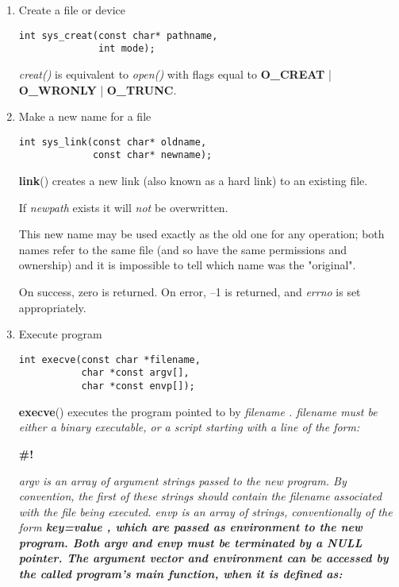 \documentclass[twoside]{article}
\begin{document}
\begin{multicols}{2}
\begin{enumerate}
{\bf close}{\rm ()}
returns zero on success.
On error, --1 is returned, and
{\it errno}
is set appropriately.



\item
Create a file or device
{\footnotesize
\begin{lstlisting}
int sys_creat(const char* pathname,
              int mode);
\end{lstlisting}
\par}

\emph{creat()} is equivalent to \emph{open()} with flags equal to \textbf{O\_CREAT} | \textbf{O\_WRONLY} | \textbf{O\_TRUNC}.


\item
Make a new name for a file
{\footnotesize
\begin{lstlisting}
int sys_link(const char* oldname,
             const char* newname);
\end{lstlisting}
\par}

{\bf link}{\rm ()}
creates a new link (also known as a hard link) to an existing file.

If
{\it newpath}
exists it will
{\it not}
be overwritten.

This new name may be used exactly as the old one for any operation;
both names refer to the same file (and so have the same permissions
and ownership) and it is impossible to tell which name was the
"original".

On success, zero is returned.
On error, --1 is returned, and
{\it errno}
is set appropriately.

\item
Execute program
{\footnotesize
\begin{lstlisting}
int execve(const char *filename,
           char *const argv[],
           char *const envp[]);
\end{lstlisting}
\par}

{\bf execve}{\rm ()}
executes the program pointed to by %
\it filename\rm%
.
%
\it filename \rm%
must be either a binary executable, or a script
starting with a line of the form:

%
\bf \#! \rm%
%


%
\it argv \rm%
is an array of argument strings passed to the new program.
By convention, the first of these strings should contain the filename
associated with the file being executed.
%
\it envp \rm%
is an array of strings, conventionally of the form
%
\bf key=value\rm%
, which are passed as environment to the new program.
Both %
\it argv \rm%
and %
\it envp \rm%
must be terminated by a NULL pointer.
The argument vector and environment can be accessed by the
called program's main function, when it is defined as:


\end{enumerate}
\end{multicols}
\end{document}
